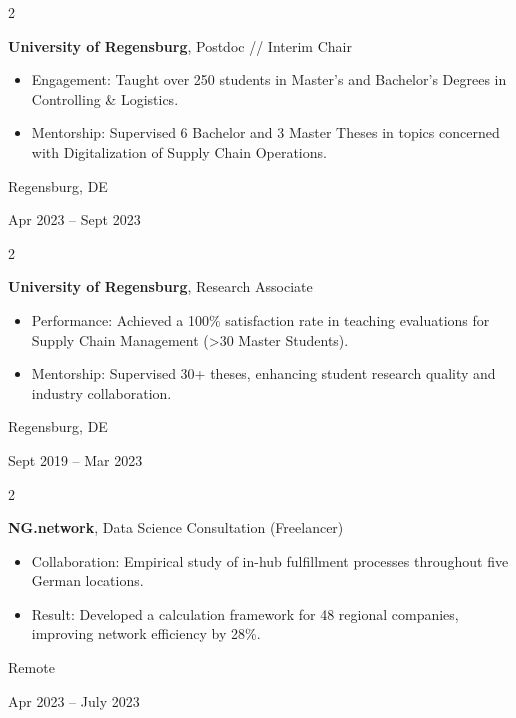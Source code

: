 \documentclass[10pt, a4paper]{article}
\newenvironment{highlights}{
    \begin{itemize}[
        topsep=0.10 cm,
        parsep=0.10 cm,
        partopsep=0pt,
        itemsep=0pt,
        leftmargin=0.4 cm + 10pt
    ]
}{
    \end{itemize}
} %
\newenvironment{twocolentry}[2][]{
    \onecolentry
    \def\secondColumn{#2}
    \setcolumnwidth{\fill, 4.5 cm}
    \begin{paracol}{2}
}{
    \switchcolumn \raggedleft \secondColumn
    \end{paracol}
    \endonecolentry
} %
\begin{document}
        \begin{twocolentry}{
            Regensburg, DE

        Apr 2023 – Sept 2023
        }
            \textbf{University of Regensburg}, Postdoc // Interim Chair
            \begin{highlights}
                \item Engagement: Taught over 250 students in Master's and Bachelor's Degrees in Controlling \& Logistics.
                \item Mentorship: Supervised 6 Bachelor and 3 Master Theses in topics concerned with Digitalization of Supply Chain Operations.
            \end{highlights}
        \end{twocolentry}


        \vspace{0.2 cm}

        \begin{twocolentry}{
            Regensburg, DE

        Sept 2019 – Mar 2023
        }
            \textbf{University of Regensburg}, Research Associate
            \begin{highlights}
                \item Performance: Achieved a 100\% satisfaction rate in teaching evaluations for Supply Chain Management (>30 Master Students).
                \item Mentorship: Supervised 30+ theses, enhancing student research quality and industry collaboration.
            \end{highlights}
        \end{twocolentry}


        \vspace{0.2 cm}

        \begin{twocolentry}{
            Remote

        Apr 2023 – July 2023
        }
            \textbf{NG.network}, Data Science Consultation (Freelancer)
            \begin{highlights}
                \item Collaboration: Empirical study of in-hub fulfillment processes throughout five German locations.
                \item Result: Developed a calculation framework for 48 regional companies, improving network efficiency by 28\%.
            \end{highlights}
        \end{twocolentry}
\end{document}
